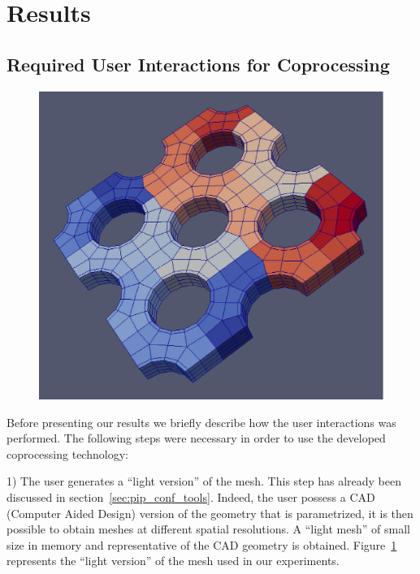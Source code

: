\section{Results}
\label{sec:results}

\subsection{Required User Interactions for Coprocessing}
   
\begin{figure}
\vspace{-20pt}
\includegraphics[scale=0.23]{pictures/pieceofcake.eps}
\label{fig:piece}
\vspace{-30pt}
\end{figure}
Before presenting our results we briefly describe how the user interactions was
performed. The following steps were necessary in order to use the developed
coprocessing technology:


1) The user generates a ``light version'' of the mesh. This step has already been
discussed in section~\ref{sec:pip_conf_tools}. Indeed, the user possess a CAD (Computer Aided
Design) version of the geometry that is parametrized, it is then possible to
obtain meshes at different spatial resolutions. A ``light mesh'' of small size in
memory and representative of the CAD geometry is obtained. Figure~\ref{fig:piece} represents
the ``light version'' of the mesh used in our experiments.



